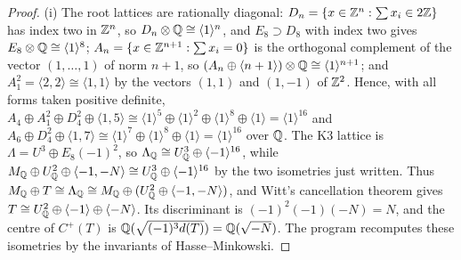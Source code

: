 \begin{proof}
(i) The root lattices are rationally diagonal: $D_{n}=\{x\in\mathbb{Z}^{n}:\sum x_{i}\in2\mathbb{Z}\}$ has index two in $\mathbb{Z}^{n}$, so $D_{n}\otimes\mathbb{Q}\cong\langle1\rangle^{n}$, and $E_{8}\supset D_{8}$ with index two gives $E_{8}\otimes\mathbb{Q}\cong\langle1\rangle^{8}$; $A_{n}=\{x\in\mathbb{Z}^{n+1}:\sum x_{i}=0\}$ is the orthogonal complement of the vector $(1,\dots,1)$ of norm $n+1$, so $(A_{n}\oplus\langle n+1\rangle)\otimes\mathbb{Q}\cong\langle1\rangle^{n+1}$; and $A_{1}^{2}=\langle2,2\rangle\cong\langle1,1\rangle$ by the vectors $(1,1)$ and $(1,-1)$ of $\mathbb{Z}^{2}$. Hence, with all forms taken positive definite, $A_{4}\oplus A_{1}^{2}\oplus D_{4}^{2}\oplus\langle1,5\rangle\cong\langle1\rangle^{5}\oplus\langle1\rangle^{2}\oplus\langle1\rangle^{8}\oplus\langle1\rangle=\langle1\rangle^{16}$ and $A_{6}\oplus D_{4}^{2}\oplus\langle1,7\rangle\cong\langle1\rangle^{7}\oplus\langle1\rangle^{8}\oplus\langle1\rangle=\langle1\rangle^{16}$ over $\mathbb{Q}$. The K3 lattice is $\Lambda=U^{3}\oplus E_{8}(-1)^{2}$, so $\Lambda_{\mathbb{Q}}\cong U_{\mathbb{Q}}^{3}\oplus\langle-1\rangle^{16}$, while $M_{\mathbb{Q}}\oplus U_{\mathbb{Q}}^{2}\oplus\langle-1,-N\rangle\cong U_{\mathbb{Q}}^{3}\oplus\langle-1\rangle^{16}$ by the two isometries just written. Thus $M_{\mathbb{Q}}\oplus T\cong\Lambda_{\mathbb{Q}}\cong M_{\mathbb{Q}}\oplus(U_{\mathbb{Q}}^{2}\oplus\langle-1,-N\rangle)$, and Witt's cancellation theorem gives $T\cong U_{\mathbb{Q}}^{2}\oplus\langle-1\rangle\oplus\langle-N\rangle$. Its discriminant is $(-1)^{2}(-1)(-N)=N$, and the centre of $C^{+}(T)$ is $\mathbb{Q}(\sqrt{(-1)^{3}d(T)})=\mathbb{Q}(\sqrt{-N})$. The program  recomputes these isometries by the invariants of Hasse--Minkowski.


\end{proof}
